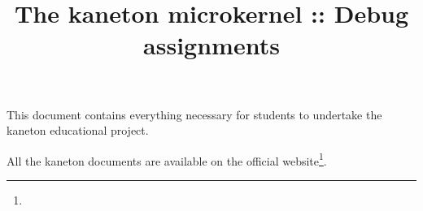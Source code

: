 %
%
%
%
%
%

%
%

%
%

\def\path{../..}

%
%



%
%


%
%

\title{The kaneton microkernel :: Debug assignments \\
       \version
       \logo}

%
%



%
%

\maketitle

%
%

This document contains everything necessary for students to undertake the
kaneton educational project.

\-

All the kaneton documents are available on
  the official website\footnote{}.

%
%

\tableofcontents

%
%

\indentation{}

%
%

%
%
%
%
%
%


